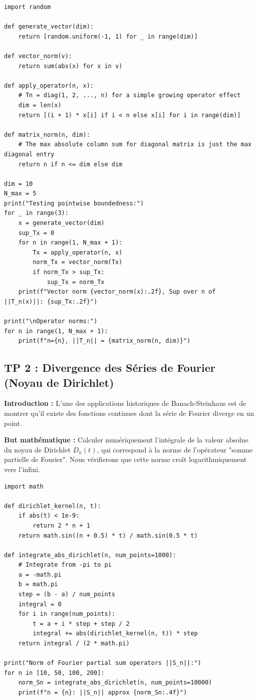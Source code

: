 \documentclass[11pt,a4paper]{article}
\begin{document}
\begin{lstlisting}
import random

def generate_vector(dim):
    return [random.uniform(-1, 1) for _ in range(dim)]

def vector_norm(v):
    return sum(abs(x) for x in v)

def apply_operator(n, x):
    # Tn = diag(1, 2, ..., n) for a simple growing operator effect
    dim = len(x)
    return [(i + 1) * x[i] if i < n else x[i] for i in range(dim)]

def matrix_norm(n, dim):
    # The max absolute column sum for diagonal matrix is just the max diagonal entry
    return n if n <= dim else dim

dim = 10
N_max = 5
print("Testing pointwise boundedness:")
for _ in range(3):
    x = generate_vector(dim)
    sup_Tx = 0
    for n in range(1, N_max + 1):
        Tx = apply_operator(n, x)
        norm_Tx = vector_norm(Tx)
        if norm_Tx > sup_Tx:
            sup_Tx = norm_Tx
    print(f"Vector norm {vector_norm(x):.2f}, Sup over n of ||T_n(x)||: {sup_Tx:.2f}")

print("\nOperator norms:")
for n in range(1, N_max + 1):
    print(f"n={n}, ||T_n|| = {matrix_norm(n, dim)}")
\end{lstlisting}
\vspace{1cm}
\subsection*{TP 2 : Divergence des Séries de Fourier (Noyau de Dirichlet)}
\textbf{Introduction :}
L'une des applications historiques de Banach-Steinhaus est de montrer qu'il existe des fonctions continues dont la série de Fourier diverge en un point.

\textbf{But mathématique :}
Calculer numériquement l'intégrale de la valeur absolue du noyau de Dirichlet $D_n(t)$, qui correspond à la norme de l'opérateur "somme partielle de Fourier". Nous vérifierons que cette norme croît logarithmiquement vers l'infini.

\begin{lstlisting}
import math

def dirichlet_kernel(n, t):
    if abs(t) < 1e-9:
        return 2 * n + 1
    return math.sin((n + 0.5) * t) / math.sin(0.5 * t)

def integrate_abs_dirichlet(n, num_points=1000):
    # Integrate from -pi to pi
    a = -math.pi
    b = math.pi
    step = (b - a) / num_points
    integral = 0
    for i in range(num_points):
        t = a + i * step + step / 2
        integral += abs(dirichlet_kernel(n, t)) * step
    return integral / (2 * math.pi)

print("Norm of Fourier partial sum operators ||S_n||:")
for n in [10, 50, 100, 200]:
    norm_Sn = integrate_abs_dirichlet(n, num_points=10000)
    print(f"n = {n}: ||S_n|| approx {norm_Sn:.4f}")
\end{lstlisting}
\vspace{1cm}
\end{document}

